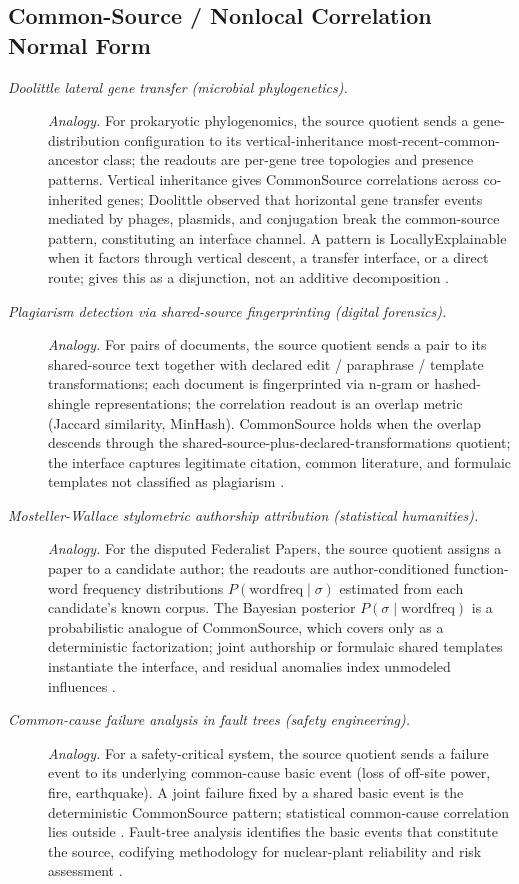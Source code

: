 \subsection*{ Common-Source / Nonlocal Correlation Normal Form}
\begingroup\small
\begin{description}
\item[\emph{Doolittle lateral gene transfer
(microbial phylogenetics).}] \textit{Analogy.}
For prokaryotic phylogenomics, the source quotient
sends a gene-distribution configuration to its
vertical-inheritance most-recent-common-ancestor
class; the readouts are per-gene tree topologies
and presence patterns.  Vertical inheritance gives
CommonSource correlations across co-inherited
genes; Doolittle observed that horizontal gene
transfer events mediated by phages, plasmids, and
conjugation break the common-source pattern,
constituting an interface channel.  A pattern is LocallyExplainable when it factors through vertical descent, a transfer interface, or a direct route;  gives this as a disjunction, not an additive decomposition \citep{Doolittle1999Phylogenetic}.

\item[\emph{Plagiarism detection via shared-source
fingerprinting (digital forensics).}] \textit{Analogy.}
For pairs of documents, the source quotient sends
a pair to its shared-source text together with
declared edit / paraphrase / template
transformations; each document is fingerprinted via
n-gram or hashed-shingle representations; the
correlation readout is an overlap metric (Jaccard
similarity, MinHash).  CommonSource holds when the
overlap descends through the
shared-source-plus-declared-transformations
quotient; the interface
captures legitimate citation, common literature,
and formulaic templates not classified as
plagiarism \citep{Heintze1996Scalable}.

\item[\emph{Mosteller-Wallace stylometric authorship
attribution (statistical humanities).}] \textit{Analogy.}
For the disputed Federalist Papers, the source
quotient assigns a paper to a candidate author; the
readouts are author-conditioned function-word
frequency distributions
\(P(\mathrm{wordfreq}\mid\sigma)\) estimated from
each candidate's known corpus.  The Bayesian
posterior \(P(\sigma\mid\mathrm{wordfreq})\) is a probabilistic analogue of CommonSource, which  covers only as a deterministic factorization; joint
authorship or formulaic shared templates
instantiate the interface, and residual anomalies
index unmodeled influences
\citep{MostellerWallace1964Federalist}.

\item[\emph{Common-cause failure analysis in
fault trees (safety engineering).}] \textit{Analogy.}
For a safety-critical system, the source quotient
sends a failure event to its underlying
common-cause basic event (loss of off-site power,
fire,
earthquake).  A joint failure fixed by a shared basic event is the deterministic CommonSource pattern; statistical common-cause correlation lies outside .  Fault-tree analysis
identifies the basic events that constitute the
source, codifying methodology for nuclear-plant
reliability and risk assessment
\citep{Vesely1981FaultTree}.
\end{description}
